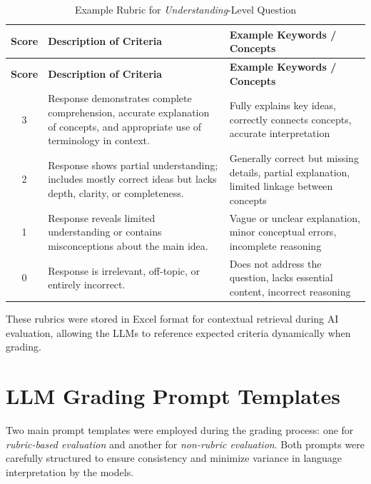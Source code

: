 {
\centering
\begin{longtable}{c p{7cm} p{6cm}}
    \caption{Example Rubric for \textit{Understanding}-Level Question}
    \label{tab:example_rubric}
    \\

    \hline
    \textbf{Score} & \textbf{Description of Criteria} & \textbf{Example Keywords / Concepts} \\
    \hline
    \endfirsthead

    \hline
    \textbf{Score} & \textbf{Description of Criteria} & \textbf{Example Keywords / Concepts} \\
    \hline
    \endhead

    \hline
    \endfoot

    3 & Response demonstrates complete comprehension, accurate explanation of concepts, and appropriate use of terminology in context. & Fully explains key ideas, correctly connects concepts, accurate interpretation \\
    2 & Response shows partial understanding; includes mostly correct ideas but lacks depth, clarity, or completeness. & Generally correct but missing details, partial explanation, limited linkage between concepts \\
    1 & Response reveals limited understanding or contains misconceptions about the main idea. & Vague or unclear explanation, minor conceptual errors, incomplete reasoning \\
    0 & Response is irrelevant, off-topic, or entirely incorrect. & Does not address the question, lacks essential content, incorrect reasoning \\
    
\end{longtable}
}

These rubrics were stored in Excel format for contextual 
retrieval during AI evaluation, allowing the LLMs to 
reference expected criteria dynamically when grading.


\section{LLM Grading Prompt Templates}

Two main prompt templates were employed during the grading 
process: one for \textit{rubric-based evaluation} and another 
for \textit{non-rubric evaluation}. Both prompts were 
carefully structured to ensure consistency and minimize 
variance in language interpretation by the models.

